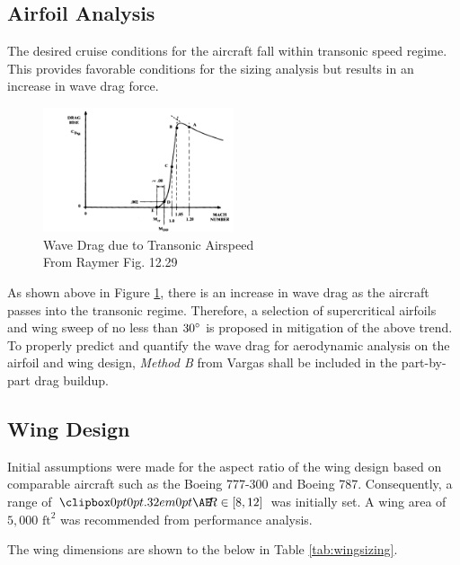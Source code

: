 \subsection{Airfoil Analysis}
The desired cruise conditions for the aircraft fall within transonic speed regime.  This provides favorable conditions for the sizing analysis but results in an increase in wave drag force.

\begin{figure}
    \vspace{-0.25in}
    \centering
    \includegraphics[width=0.5\textwidth]{Photos/wavedragduetotransonic.png}
    \caption{Wave Drag due to Transonic Airspeed\\{\small From Raymer Fig. 12.29\cite{raymer}}}
    \label{fig:transonic}
    \vspace{-0.5in}
\end{figure}

As shown above in Figure \ref{fig:transonic}, there is an increase in wave drag as the aircraft passes into the transonic regime.  Therefore, a selection of supercritical airfoils and wing sweep of no less than $30\degree$ is proposed in mitigation of the above trend.  To properly predict and quantify the wave drag for aerodynamic analysis on the airfoil and wing design, \textit{Method B} from Vargas\cite{vargas} shall be included in the part-by-part drag buildup.

\subsection{Wing Design}
Initial assumptions were made for the aspect ratio of the wing design based on comparable aircraft such as the Boeing 777-300 and Boeing 787.  Consequently, a range of $\AR \in [8,12]$ was initially set.  A wing area of $5,000 \text{ ft}^2$ was recommended from performance analysis.  

The wing dimensions are shown to the below in Table \ref{tab:wingsizing}.

